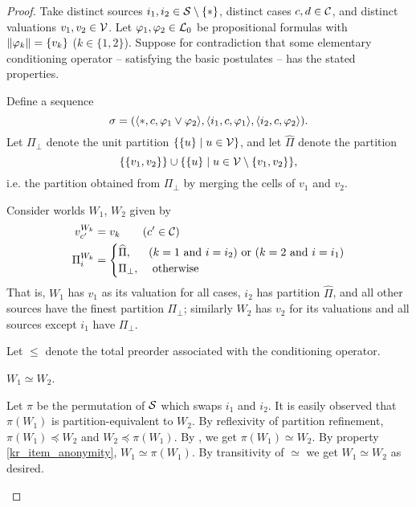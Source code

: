 \begin{proof}
    Take distinct sources $i_1, i_2 \in \mathcal{S} \setminus \{\ast\}$, distinct cases
    $c, d \in \mathcal{C}$, and distinct valuations $v_1, v_2 \in \mathcal{V}$. Let $\varphi_1,
    \varphi_2 \in \mathcal{L}{}_0$ be propositional formulas with $\|{\varphi_k}\| =
    \{v_k\}$
    ($k \in \{1, 2\}$). Suppose for contradiction that some elementary
    conditioning operator -- satisfying the basic postulates -- has the stated
    properties.

    Define a sequence
    \[
        \sigma
        = (
            \langle {\ast, c, \varphi_1 \lor \varphi_2} \rangle,
            \langle {i_1, c, \varphi_1} \rangle,
            \langle {i_2, c, \varphi_2} \rangle
        ).
    \]
    Let $\Pi_\bot$ denote the unit partition $\{\{u\} \mid u \in \mathcal{V}\}$, and
    let $\widehat{\Pi}$ denote the partition
    \[
         \{\{v_1, v_2\}\}
         \cup
         \{\{u\} \mid u \in \mathcal{V} \setminus \{v_1, v_2\}\},
    \]
    i.e. the partition obtained from $\Pi_\bot$ by merging the cells of $v_1$
    and $v_2$.

    Consider worlds $W_1$, $W_2$ given by
    \begin{align*}
         v^{W_k}_{c'} &= v_k \qquad (c' \in \mathcal{C}) \\
         \Pi^{W_k}_i &= \begin{cases}
            \widehat{\Pi},&
                (k = 1 \text{ and } i = i_2)
                \text { or }
                (k = 2 \text{ and } i = i_1) \\
            \Pi_\bot,& \text{ otherwise }
         \end{cases}
    \end{align*}
    That is, $W_1$ has $v_1$ as its valuation for all cases, $i_2$ has
    partition $\widehat{\Pi}$, and all other sources have the finest partition
    $\Pi_\bot$; similarly $W_2$ has $v_2$ for its valuations and all sources
    except $i_1$ have $\Pi_\bot$.

    Let $\le$ denote the total preorder associated with the conditioning
    operator.

        \begin{claim}
            \label{kr_claim_w1_simeq_w2}
            $W_1 \simeq W_2$.
        \end{claim}
        \begin{claimproof}
            Let $\pi$ be the permutation of $\mathcal{S}$ which swaps $i_1$ and $i_2$.
            It is easily observed that $\pi(W_1)$ is partition-equivalent to
            $W_2$. By reflexivity of partition refinement, $\pi(W_1) \preceq
            W_2$ and $W_2 \preceq \pi(W_1)$. By , we get $\pi(W_1)
            \simeq W_2$. By property \cref{kr_item_anonymity}, $W_1 \simeq
            \pi(W_1)$. By transitivity of ${\simeq}$ we get $W_1 \simeq W_2$ as
            desired.
        \end{claimproof}


\end{proof}
